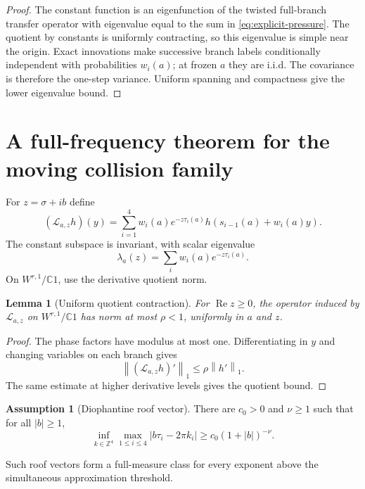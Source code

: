 \documentclass[11pt,reqno]{amsart}
\newtheorem{lemma}[theorem]{Lemma}
\theoremstyle{definition}
\newtheorem{assumption}[theorem]{Assumption}
\theoremstyle{remark}
\newcommand{\C}{\mathbb C}
\newcommand{\norm}[1]{\left\lVert #1\right\rVert}
\newcommand{\abs}[1]{\left\lvert #1\right\rvert}
\begin{document}
\begin{proof}
The constant function is an eigenfunction of the twisted full-branch transfer
operator with eigenvalue equal to the sum in \eqref{eq:explicit-pressure}.
The quotient by constants is uniformly contracting, so this eigenvalue is
simple near the origin.  Exact innovations make successive branch labels
conditionally independent with probabilities $w_i(a)$; at frozen $a$ they are
i.i.d.  The covariance is therefore the one-step variance.  Uniform spanning
and compactness give the lower eigenvalue bound.
\end{proof}

\section{A full-frequency theorem for the moving collision family}

For $z=\sigma+ib$ define
\begin{equation}\label{eq:twisted-full-branch}
 (\mathcal L_{a,z}h)(y)=
 \sum_{i=1}^4w_i(a)e^{-z\tau_i(a)}
 h(s_{i-1}(a)+w_i(a)y).
\end{equation}
The constant subspace is invariant, with scalar eigenvalue
\begin{equation}\label{eq:lambda-z}
 \lambda_a(z)=\sum_iw_i(a)e^{-z\tau_i(a)}.
\end{equation}
On $W^{r,1}/\C1$, use the derivative quotient norm.

\begin{lemma}[Uniform quotient contraction]\label{lem:quotient}
For $\operatorname{Re}z\ge0$, the operator induced by
$\mathcal L_{a,z}$ on $W^{r,1}/\C1$ has norm at most $\rho<1$, uniformly in
$a$ and $z$.
\end{lemma}

\begin{proof}
The phase factors have modulus at most one.  Differentiating in $y$ and
changing variables on each branch gives
\[
 \norm{(\mathcal L_{a,z}h)'}_1
 \le\rho\norm{h'}_1.
\]
The same estimate at higher derivative levels gives the quotient bound.
\end{proof}

\begin{assumption}[Diophantine roof vector]\label{ass:diophantine}
There are $c_0>0$ and $\nu\ge1$ such that for all $\abs b\ge1$,
\begin{equation}\label{eq:diophantine}
 \inf_{k\in\mathbb Z^4}
 \max_{1\le i\le4}\abs{b\tau_i-2\pi k_i}
 \ge c_0(1+\abs b)^{-\nu}.
\end{equation}
\end{assumption}
Such roof vectors form a full-measure class for every exponent above the
simultaneous approximation threshold.
\end{document}

